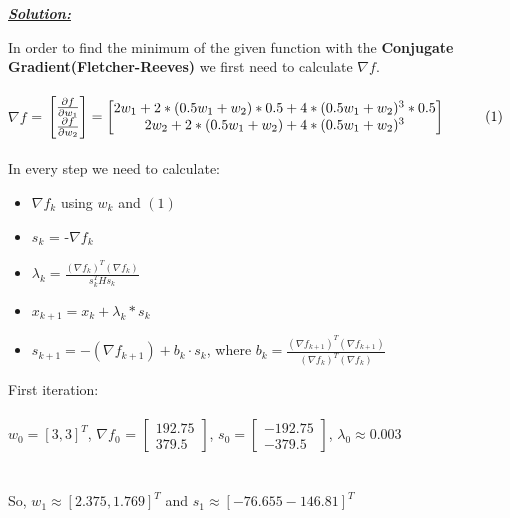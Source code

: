 \documentclass{article}
\begin{document}
\noindent \underline{\textbf{\textit{Solution:}}}

\noindent In order to find the minimum of the given function with the \textbf{Conjugate Gradient(Fletcher-Reeves)} we first need to calculate \( \nabla f \). \\ \\
\( \nabla f \) = $ \begin{bmatrix}
  \frac{\partial f}{\partial w_1} \\
  \frac{\partial f}{\partial w_2} 
\end{bmatrix} = \begin{bmatrix}
  2w_1 + 2*(0.5w_1+w_2)*0.5 +4*(0.5w_1+w_2)^3 * 0.5 \\
  2w_2 +2*(0.5w_1+w_2) +4*(0.5w_1+w_2)^3 
\end{bmatrix} \hspace*{1cm}(1)$ \\ \\

\vspace{0.5cm}
\noindent In every step we need to calculate:
\begin{itemize}
  \item \( \nabla f_k \) using $w_k$ and $(1)$
  \item $s_k$ = -\( \nabla f_k \)
  \item $\lambda_k = \frac{(\nabla f_k)^T (\nabla f_k)}{s_k^T H s_k}$
  \item $x_{k+1} = x_k + \lambda_k*s_k$
  \item $s_{k+1} = -(\nabla f_{k+1}) + b_k \cdot s_k$, where $b_k = \frac{(\nabla f_{k+1})^T (\nabla f_{k+1})}{(\nabla f_{k})^T (\nabla f_{k})}$
  
\end{itemize}
\vspace{1cm}
\noindent First iteration:\\\\ $w_0 = [3,3]^T$, \( \nabla f_0 \) = $ \begin{bmatrix} 
  192.75 \\
  379.5 
\end{bmatrix}$, $ s_0 = \begin{bmatrix} 
  -192.75 \\
  -379.5 
\end{bmatrix}$, $\lambda_0 \approx 0.003$\\ \\ \\ So, $w_1 \approx [2.375, 1.769]^T$ and $s_1 \approx [-76.655 -146.81]^T$
\newpage
\end{document}

